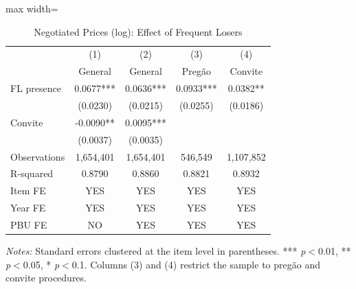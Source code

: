 \begin{table}[htbp]
\centering
\caption{Negotiated Prices (log): Effect of Frequent Losers}
\label{tab:prices}
\begin{adjustbox}{max width=\textwidth}
\begin{threeparttable}
\small
\begin{tabular}{lcccc}
\toprule
 & (1) & (2) & (3) & (4) \\
 & General & General & Preg\~{a}o & Convite \\
\midrule
FL presence & 0.0677*** & 0.0636*** & 0.0933*** & 0.0382** \\
 & (0.0230) & (0.0215) & (0.0255) & (0.0186) \\
Convite & -0.0090** & 0.0095*** &  &  \\
 & (0.0037) & (0.0035) &  &  \\
\midrule
Observations & 1,654,401 & 1,654,401 & 546,549 & 1,107,852 \\
R-squared & 0.8790 & 0.8860 & 0.8821 & 0.8932 \\
Item FE & YES & YES & YES & YES \\
Year FE & YES & YES & YES & YES \\
PBU FE & NO & YES & YES & YES \\
\bottomrule
\end{tabular}
\begin{tablenotes}
\small
\item \textit{Notes:} Standard errors clustered at the item level in parentheses. *** \textit{p}$<$0.01, ** \textit{p}$<$0.05, * \textit{p}$<$0.1. Columns (3) and (4) restrict the sample to preg\~{a}o and convite procedures.
\end{tablenotes}
\end{threeparttable}
\end{adjustbox}
\end{table}
